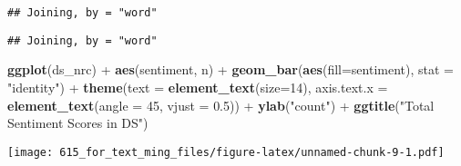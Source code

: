 \documentclass[]{article}
\newenvironment{Shaded}{\begin{snugshade}}{\end{snugshade}}
\newcommand{\KeywordTok}[1]{\textcolor[rgb]{0.13,0.29,0.53}{\textbf{{#1}}}}
\newcommand{\DataTypeTok}[1]{\textcolor[rgb]{0.13,0.29,0.53}{{#1}}}
\newcommand{\DecValTok}[1]{\textcolor[rgb]{0.00,0.00,0.81}{{#1}}}
\newcommand{\FloatTok}[1]{\textcolor[rgb]{0.00,0.00,0.81}{{#1}}}
\newcommand{\StringTok}[1]{\textcolor[rgb]{0.31,0.60,0.02}{{#1}}}
\newcommand{\CommentTok}[1]{\textcolor[rgb]{0.56,0.35,0.01}{\textit{{#1}}}}
\newcommand{\NormalTok}[1]{{#1}}
\begin{document}
\begin{Shaded}
\end{Shaded}

\begin{verbatim}
## Joining, by = "word"
\end{verbatim}

\begin{Shaded}
\end{Shaded}

\begin{verbatim}
## Joining, by = "word"
\end{verbatim}

\begin{Shaded}
\begin{Highlighting}[]
\KeywordTok{ggplot}\NormalTok{(ds_nrc) +}\StringTok{ }\KeywordTok{aes}\NormalTok{(sentiment, n) +}\StringTok{ }\KeywordTok{geom_bar}\NormalTok{(}\KeywordTok{aes}\NormalTok{(}\DataTypeTok{fill=}\NormalTok{sentiment), }\DataTypeTok{stat =} \StringTok{"identity"}\NormalTok{) +}
\StringTok{  }\KeywordTok{theme}\NormalTok{(}\DataTypeTok{text =} \KeywordTok{element_text}\NormalTok{(}\DataTypeTok{size=}\DecValTok{14}\NormalTok{), }\DataTypeTok{axis.text.x =} \KeywordTok{element_text}\NormalTok{(}\DataTypeTok{angle =} \DecValTok{45}\NormalTok{, }\DataTypeTok{vjust =} \FloatTok{0.5}\NormalTok{)) +}
\StringTok{  }\KeywordTok{ylab}\NormalTok{(}\StringTok{"count"}\NormalTok{) +}\StringTok{ }\KeywordTok{ggtitle}\NormalTok{(}\StringTok{"Total Sentiment Scores in DS"}\NormalTok{)}
\end{Highlighting}
\end{Shaded}

\texttt{[image: 615\_for\_text\_ming\_files/figure-latex/unnamed-chunk-9-1.pdf]}
\end{document}
